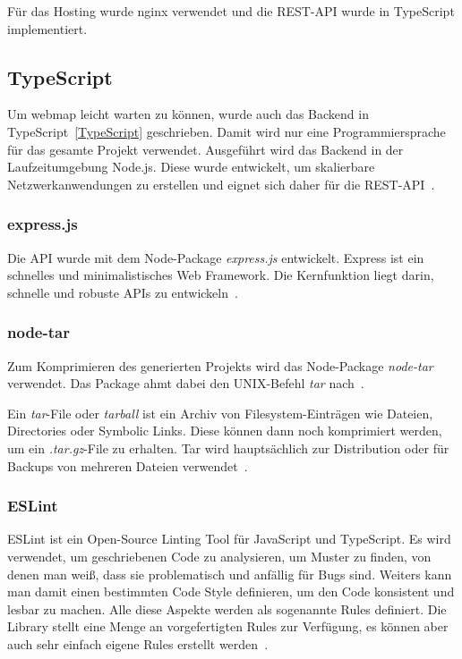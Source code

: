 Für das Hosting wurde nginx verwendet und die REST-API wurde in TypeScript implementiert.

\subsection{TypeScript}
Um webmap leicht warten zu können, wurde auch das Backend in TypeScript~\ref{TypeScript} geschrieben.
 Damit wird nur eine Programmiersprache für das gesamte Projekt verwendet.
 Ausgeführt wird das Backend in der Laufzeitumgebung Node.js.
 Diese wurde entwickelt, um skalierbare Netzwerkanwendungen zu erstellen und eignet sich daher für
 die REST-API~\cite{about-node-js}.

\subsubsection{express.js}
Die API wurde mit dem Node-Package \textit{express.js} entwickelt.
 Express ist ein schnelles und minimalistisches Web Framework.
 Die Kernfunktion liegt darin, schnelle und robuste APIs zu entwickeln~\cite{expressjs}.

\subsubsection{node-tar}
Zum Komprimieren des generierten Projekts wird das Node-Package \textit{node-tar} verwendet.
 Das Package ahmt dabei den UNIX-Befehl \textit{tar} nach~\cite{node-tar}.

Ein \textit{tar}-File oder \textit{tarball} ist ein Archiv von Filesystem-Einträgen wie Dateien, Directories oder
Symbolic Links.
 Diese können dann noch komprimiert werden, um ein \textit{.tar.gz}-File zu erhalten.
 Tar wird hauptsächlich zur Distribution oder für Backups von mehreren Dateien verwendet~\cite{tar-manpage}.

 \subsubsection{ESLint}
 ESLint ist ein Open-Source Linting Tool für JavaScript und TypeScript.
 Es wird verwendet, um geschriebenen Code zu analysieren, um Muster zu finden, von denen man weiß, dass sie
 problematisch und anfällig für Bugs sind.
 Weiters kann man damit einen bestimmten Code Style definieren, um den Code konsistent und lesbar zu machen.
 Alle diese Aspekte werden als sogenannte Rules definiert.
 Die Library stellt eine Menge an vorgefertigten Rules zur Verfügung, es können aber auch sehr einfach eigene
 Rules erstellt werden~\cite{eslint}.

